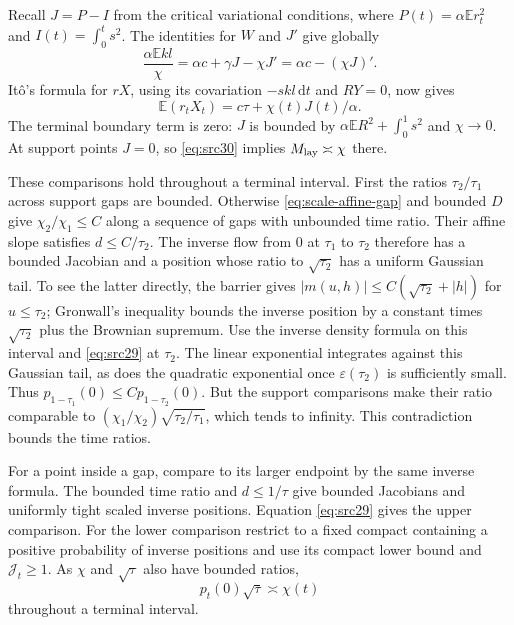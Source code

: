 \documentclass[11pt,a4paper]{article}
\numberwithin{equation}{section}
\theoremstyle{definition}
\theoremstyle{remark}
\newcommand{\E}{\mathbb E}
\newcommand{\dd}{\mathrm d}
\newcommand{\eps}{\varepsilon}
\begin{document}
Recall $J=P-I$ from the critical variational conditions, where
$P(t)=\alpha\E r_t^2$ and $I(t)=\int_0^ts^2$.
The identities for $W$ and $J'$ give globally
\[
 \frac{\alpha\E kl}{\chi}=\alpha c+\gamma J-\chi J'
                         =\alpha c-(\chi J)'.
\]
It\^o's formula for $rX$, using its covariation $-skl\,\dd t$ and
$RY=0$, now gives
\begin{equation}\label{eq:scale-mixed-moment}
 \E(r_tX_t)=c\tau+\chi(t)J(t)/\alpha.
\end{equation}
The terminal boundary term is zero: $J$ is bounded by
$\alpha\E R^2+\int_0^1s^2$ and $\chi\to0$.
At support points $J=0$, so \eqref{eq:src30} implies
$M_{\rm lay}\asymp\chi$ there.

These comparisons hold throughout a terminal interval. First the
ratios $\tau_2/\tau_1$ across support gaps are bounded. Otherwise
\eqref{eq:scale-affine-gap} and bounded $D$ give
$\chi_2/\chi_1\le C$ along a sequence of gaps with unbounded time
ratio. Their affine slope satisfies $d\le C/\tau_2$.
The inverse flow from $0$ at $\tau_1$ to $\tau_2$ therefore has a
bounded Jacobian and a position whose ratio to $\sqrt{\tau_2}$ has
a uniform Gaussian tail. To see the latter directly, the barrier gives
$|m(u,h)|\le C(\sqrt{\tau_2}+|h|)$ for $u\le\tau_2$;
Gronwall's inequality bounds the inverse position by a constant times
$\sqrt{\tau_2}$ plus the Brownian supremum.
Use the inverse density formula on this interval and
\eqref{eq:src29} at $\tau_2$. The linear exponential integrates
against this Gaussian tail, as does the quadratic exponential once
$\eps(\tau_2)$ is sufficiently small. Thus
$p_{1-\tau_1}(0)\le Cp_{1-\tau_2}(0)$.
But the support comparisons make their ratio comparable to
$(\chi_1/\chi_2)\sqrt{\tau_2/\tau_1}$, which tends to infinity.
This contradiction bounds the time ratios.

For a point inside a gap, compare to its larger endpoint by the same
inverse formula. The bounded time ratio and $d\le1/\tau$ give
bounded Jacobians and uniformly tight scaled inverse positions.
Equation \eqref{eq:src29} gives the upper comparison. For the lower
comparison restrict to a fixed compact containing a positive
probability of inverse positions and use its compact lower bound and
$\mathcal J_t\ge1$. As $\chi$ and $\sqrt\tau$ also have bounded ratios,
\begin{equation}\label{eq:scale-layer-mass}
 p_t(0)\sqrt\tau\asymp\chi(t)
\end{equation}
throughout a terminal interval.
\end{document}
